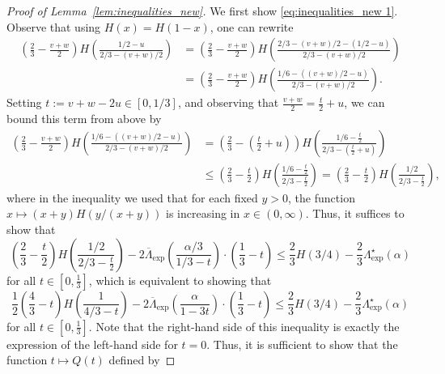 \documentclass[11pt]{article}
\numberwithin{equation}{section}
\theoremstyle{definition}
\begin{document}
\begin{proof}[Proof of Lemma~\ref{lem:inequalities_new}]
We first show \eqref{eq:inequalities_new 1}. Observe that using $H(x) = H(1-x)$, one can rewrite
\begin{align*}
      \left(\frac{2}{3} - \frac{v+w}{2} \right)
      H\left(\frac{1/2 - u}{2/3 - (v+w)/2}\right)  & = \left(\frac{2}{3} - \frac{v+w}{2} \right)
      H\left(\frac{2/3 - (v+w)/2 - (1/2-u)}{2/3 - (v+w)/2}\right)
      \\
      &
      =
      \left(\frac{2}{3} - \frac{v+w}{2} \right)
      H\left(\frac{1/6 - ((v+w)/2 - u) }{2/3 - (v+w)/2}\right).
\end{align*}   
Setting $t := v+w-2u \in [0,1/3]$, and observing that $\frac{v+w}{2} = \frac{t}{2}+ u$, we can bound this term from above by
\begin{align*}
    \left(\frac{2}{3} - \frac{v+w}{2} \right) 
    H\left(\frac{1/6 - ((v+w)/2 - u) }{2/3 - (v+w)/2}\right) &
    =
    \left(\frac{2}{3} - \left(\frac{t}{2} + u\right) \right)
    H\left(\frac{1/6 - \frac{t}{2} }{2/3 - \left(\frac{t}{2} + u\right)}\right)
    \\
    &
    \leq
    \left(\frac{2}{3} - \frac{t}{2} \right) H\left(\frac{1/6 - \frac{t}{2} }{2/3 - \frac{t}{2}}\right)
    =
    \left(\frac{2}{3} - \frac{t}{2} \right)
    H\left(\frac{1/2}{2/3 - \frac{t}{2}}\right),
\end{align*}
where in the inequality we used that 
for each fixed $y>0$, the function
$x \mapsto \left(x+y \right)H\left( y/(x+y) \right)$
is increasing in $x \in (0,\infty)$.
Thus, it suffices to show that
\begin{equation*}
    \left( \frac{2}{3} - \frac{t}{2} \right) H\left(\frac{1/2}{2/3 - \frac{t}{2}}\right) -  2 \overline{\Lambda}_{\exp} \left(\frac{\alpha /3 }{1/3 - t} \right) \cdot \left( \frac{1}{3} - t \right)
    \leq
    \frac{2}{3}H(3/4) - \frac{2}{3} \Lambda_{\exp}^{\star} (\alpha)
\end{equation*}
for all $t \in  \left[0,\frac{1}{3}\right]$, 
which is equivalent to showing that
\begin{equation}\label{equation:reference1}
    \frac{1}{2} \left( \frac{4}{3} - t \right) H\left(\frac{1}{4/3 - t}\right) -  2 \overline{\Lambda}_{\exp} \left(\frac{\alpha}{1 - 3t} \right) \cdot \left( \frac{1}{3} - t \right)
    \leq
    \frac{2}{3}H(3/4) - \frac{2}{3} \Lambda_{\exp}^{\star} (\alpha)
\end{equation}
for all $t\in \left[0,\frac{1}{3}\right]$. 
Note that the right-hand side of this inequality is exactly the expression of the left-hand side for $t=0$. Thus, it is sufficient to show that the function $t\mapsto Q(t)$ defined by

\end{proof}
\end{document}
